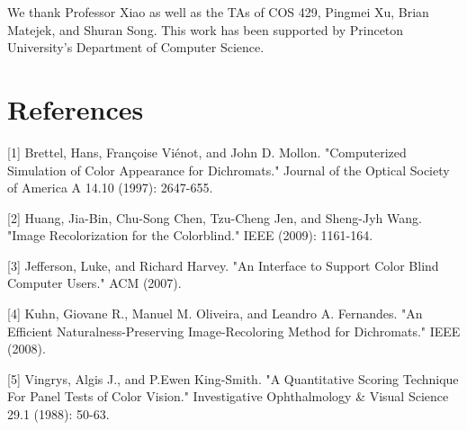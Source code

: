 \documentclass[10pt,twocolumn,letterpaper]{article}
\begin{document}
We thank Professor Xiao as well as the TAs of COS 429, Pingmei Xu, Brian Matejek, and Shuran Song. This work has been supported by Princeton University’s Department of Computer Science. 


\section{References}

{\small


[1] Brettel, Hans, Françoise Viénot, and John D. Mollon. "Computerized Simulation of Color 
Appearance for Dichromats." Journal of the Optical Society of America A 14.10 (1997): 2647-655. 

[2] Huang, Jia-Bin, Chu-Song Chen, Tzu-Cheng Jen, and Sheng-Jyh Wang. "Image Recolorization for the Colorblind." IEEE (2009): 1161-164. 

[3] Jefferson, Luke, and Richard Harvey. "An Interface to Support Color Blind Computer Users." ACM (2007).

[4] Kuhn, Giovane R., Manuel M. Oliveira, and Leandro A. Fernandes. "An Efficient Naturalness-Preserving Image-Recoloring Method for Dichromats." IEEE (2008).

[5] Vingrys, Algis J., and P.Ewen King-Smith. "A Quantitative Scoring Technique For Panel Tests of Color Vision." Investigative Ophthalmology \& Visual Science 29.1 (1988): 50-63. 

}
\end{document}

